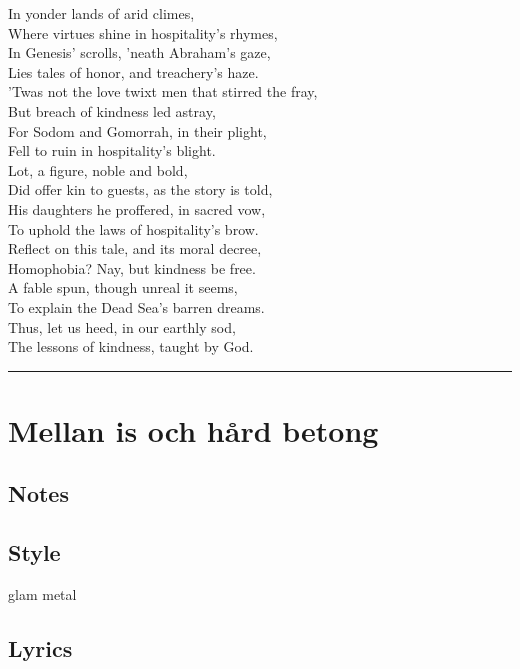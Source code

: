 \documentclass[]{article}
\begin{document}
In yonder lands of arid climes,\\
Where virtues shine in hospitality's rhymes,\\
In Genesis' scrolls, 'neath Abraham's gaze,\\
Lies tales of honor, and treachery's haze.\\
'Twas not the love twixt men that stirred the fray,\\
But breach of kindness led astray,\\
For Sodom and Gomorrah, in their plight,\\
Fell to ruin in hospitality's blight.\\
Lot, a figure, noble and bold,\\
Did offer kin to guests, as the story is told,\\
His daughters he proffered, in sacred vow,\\
To uphold the laws of hospitality's brow.\\
Reflect on this tale, and its moral decree,\\
Homophobia? Nay, but kindness be free.\\
A fable spun, though unreal it seems,\\
To explain the Dead Sea's barren dreams.\\
Thus, let us heed, in our earthly sod,\\
The lessons of kindness, taught by God.

\begin{center}\rule{0.5\linewidth}{0.5pt}\end{center}

\section{Mellan is och hård betong}\label{mellan-is-och-huxe5rd-betong}

\subsection{Notes}\label{notes-4}

\subsection{Style}\label{style-4}

glam metal

\subsection{Lyrics}\label{lyrics-4}
\end{document}
